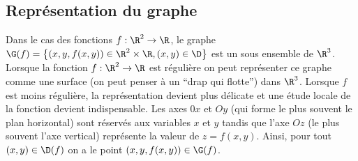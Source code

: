 \subsection{Représentation du graphe}

Dans le cas des fonctions $f:\R^2 \to \R$, le graphe $\G(f) = \left\{ (x,y,f(x,y))\in \R^2 \times \R, (x,y) \in \D \right\}$ est un sous ensemble de $\R^3$. Lorsque la fonction $f:\R^2\to\R$ est régulière on peut représenter ce graphe comme une surface (on peut penser à un ``drap qui flotte'') dans $\R^3$. Lorsque $f$ est moins régulière, la représentation devient plus délicate et une étude locale de la fonction devient indispensable. 
Les axes $0x$ et $Oy$ (qui forme le plus souvent le plan horizontal) sont réservés aux variables $x$ et $y$ tandis que l'axe $Oz$ (le plus souvent l'axe vertical) représente la valeur de $z = f(x,y)$. Ainsi, pour tout $(x,y) \in \D(f)$ on a le point $(x,y,f(x,y)) \in \G(f)$. 
\begin{center}
	
\end{center}


